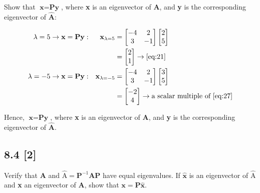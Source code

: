 \documentclass{article}
\begin{document}
Show that $\textbf{x}=\textbf{Py}$, where \textbf{x} is an eigenvector of \textbf{A}, and \textbf{y} is the corresponding eigenvector of $\hat{\textbf{A}}$:

\begin{align}
    \label{eq:40}
    \lambda = 5 \rightarrow \textbf{x} = \textbf{Py}: 
    && \textbf{x}_{\lambda = 5} &= \begin{bmatrix}
    -4 & 2\\ 3 & -1
    \end{bmatrix} \begin{bmatrix} 2\\5 \end{bmatrix}
    \\
    \label{eq:41}
    && &= \begin{bmatrix}
    2\\1
    \end{bmatrix} \rightarrow \eqref{eq:21}
    \\
    \label{eq:42}
    \lambda = -5 \rightarrow \textbf{x} = \textbf{Py}: && 
    \textbf{x}_{\lambda=-5} &= \begin{bmatrix}
    -4 & 2\\ 3 & -1
    \end{bmatrix} \begin{bmatrix}
    3\\5
    \end{bmatrix}
    \\
    \label{eq:43}
    && &= \begin{bmatrix}
    -2 \\ 4
    \end{bmatrix} \rightarrow \text{a scalar multiple of } \eqref{eq:27} 
\end{align}

Hence, $\textbf{x}=\textbf{Py}$, where \textbf{x} is an eigenvector of \textbf{A}, and \textbf{y} is the corresponding eigenvector of $\hat{\textbf{A}}$.

\subsection*{8.4 [2]}
\setcounter{equation}{0}

Verify that \textbf{A} and \textbf{$\hat{\text{A}} = \textbf{P}^{-1} \textbf{A} \textbf{P}$} have equal eigenvalues.  If $\hat{\textbf{x}}$ is an eigenvector of \textbf{$\hat{\text{A}}$} and \textbf{x} an eigenvector of \textbf{A}, show that $\textbf{x}=\textbf{P}\hat{\textbf{x}}$.
\end{document}
